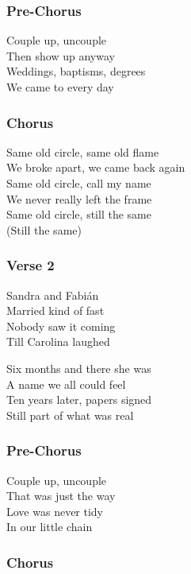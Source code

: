 \subsubsection{Pre-Chorus}\label{pre-chorus-14}

Couple up, uncouple\\
Then show up anyway\\
Weddings, baptisms, degrees\\
We came to every day

\subsubsection{Chorus}\label{chorus-34}

Same old circle, same old flame\\
We broke apart, we came back again\\
Same old circle, call my name\\
We never really left the frame\\
Same old circle, still the same\\
(Still the same)

\subsubsection{Verse 2}\label{verse-2-12}

Sandra and Fabián\\
Married kind of fast\\
Nobody saw it coming\\
Till Carolina laughed

Six months and there she was\\
A name we all could feel\\
Ten years later, papers signed\\
Still part of what was real

\subsubsection{Pre-Chorus}\label{pre-chorus-15}

Couple up, uncouple\\
That was just the way\\
Love was never tidy\\
In our little chain

\subsubsection{Chorus}\label{chorus-35}

